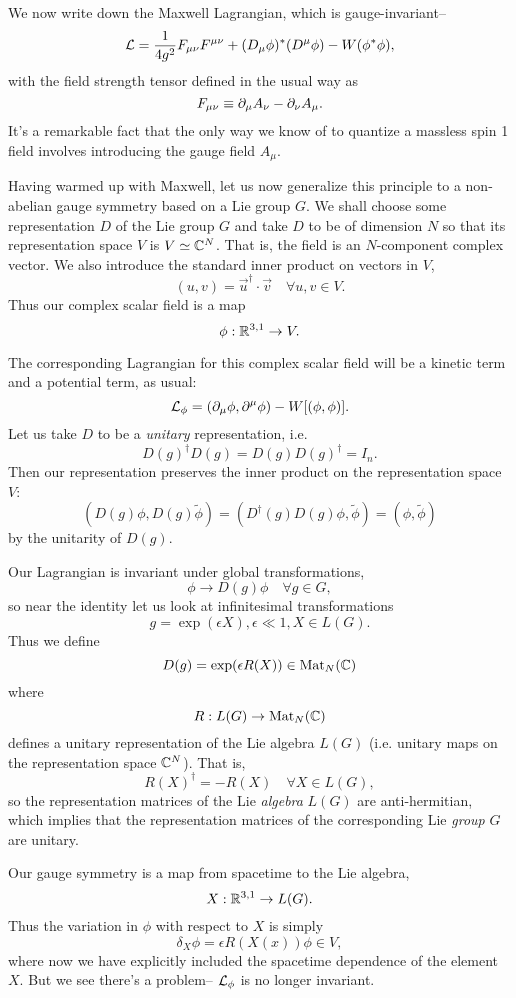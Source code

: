 We now write down the Maxwell Lagrangian, which is gauge-invariant--
$$\mathcal L = \frac{1}{4g^2} F_{\mu\nu} F^{\mu\nu}+(D_\mu \phi)^* (D^\mu \phi) -W(\phi^* \phi),$$
with the field strength tensor defined in the usual way as
$$F_{\mu\nu}\equiv\partial_\mu A_\nu -\partial_\nu A_\mu.$$
It's a remarkable fact that the only way we know of to quantize a massless spin 1 field involves introducing the gauge field $A_\mu$.

Having warmed up with Maxwell, let us now generalize this principle to a non-abelian gauge symmetry based on a Lie group $G$. We shall choose some representation $D$ of the Lie group $G$ and take $D$ to be of dimension $N$ so that its representation space $V$ is $V\simeq \mathbb{C}^N$. That is, the field is an $N$-component complex vector. We also introduce the standard inner product on vectors in $V$, 
$$(u,v)=\vec u^\dagger \cdot \vec v\quad \forall u,v\in V.$$
Thus our complex scalar field is a map
$$\phi:\mathbb{R}^{3,1}\to V.$$

The corresponding Lagrangian for this complex scalar field will be a kinetic term and a potential term, as usual:
$$\mathcal L_\phi = (\partial_\mu \phi, \partial^\mu \phi)-W[(\phi,\phi)].$$
Let us take $D$ to be a \emph{unitary} representation, i.e.
$$D(g)^\dagger D(g)=D(g) D(g)^\dagger = I_n.$$
Then our representation preserves the inner product on the representation space $V$:
$$(D(g)\phi, D(g) \tilde \phi)=(D^\dagger(g) D(g)\phi,\tilde \phi)=(\phi,\tilde\phi)$$
by the unitarity of $D(g)$.

Our Lagrangian is invariant under global transformations,
$$\phi \to D(g)\phi \quad \forall g\in G,$$
so near the identity let us look at infinitesimal transformations
$$g=\exp(\epsilon X), \epsilon \ll 1, X \in L(G).$$
Thus we define
$$D(g)=\exp(\epsilon R(X))\in \text{Mat}_N(\mathbb{C})$$
where
$$R:L(G)\to \text{Mat}_N (\mathbb{C})$$
defines a unitary representation of the Lie algebra $L(G)$ (i.e. unitary maps on the representation space $\mathbb{C}^N$). That is,
$$R(X)^\dagger = -R(X) \quad \forall X \in L(G),$$
so the representation matrices of the Lie \emph{algebra} $L(G)$ are anti-hermitian, which implies that the representation matrices of the corresponding Lie \emph{group} $G$ are unitary.

Our gauge symmetry is a map from spacetime to the Lie algebra,
$$X:\mathbb{R}^{3,1} \to L(G).$$
Thus the variation in $\phi$ with respect to $X$ is simply
$$\delta_X \phi = \epsilon R(X(x))\phi \in V,$$
where now we have explicitly included the spacetime dependence of the element $X$. But we see there's a problem-- $\mathcal L_\phi$ is no longer invariant.


